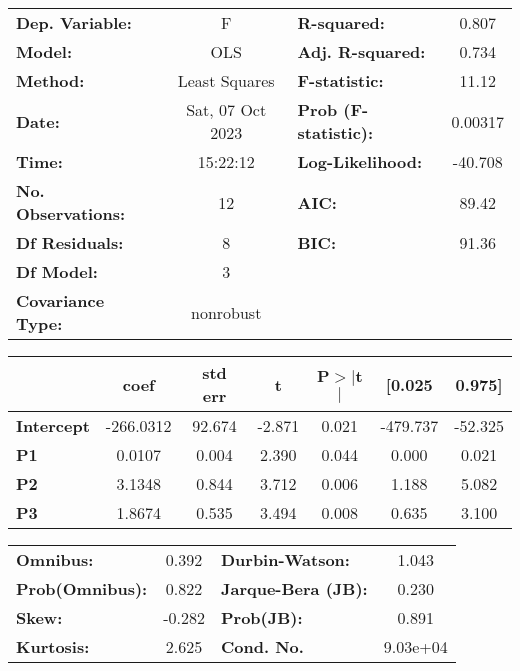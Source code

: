 \documentclass[11pt]{article}
\begin{document}
    \begin{center}
\begin{tabular}{lclc}
\toprule
\textbf{Dep. Variable:}    &        F         & \textbf{  R-squared:         } &     0.807   \\
\textbf{Model:}            &       OLS        & \textbf{  Adj. R-squared:    } &     0.734   \\
\textbf{Method:}           &  Least Squares   & \textbf{  F-statistic:       } &     11.12   \\
\textbf{Date:}             & Sat, 07 Oct 2023 & \textbf{  Prob (F-statistic):} &  0.00317    \\
\textbf{Time:}             &     15:22:12     & \textbf{  Log-Likelihood:    } &   -40.708   \\
\textbf{No. Observations:} &          12      & \textbf{  AIC:               } &     89.42   \\
\textbf{Df Residuals:}     &           8      & \textbf{  BIC:               } &     91.36   \\
\textbf{Df Model:}         &           3      & \textbf{                     } &             \\
\textbf{Covariance Type:}  &    nonrobust     & \textbf{                     } &             \\
\bottomrule
\end{tabular}
\begin{tabular}{lcccccc}
                   & \textbf{coef} & \textbf{std err} & \textbf{t} & \textbf{P$> |$t$|$} & \textbf{[0.025} & \textbf{0.975]}  \\
\midrule
\textbf{Intercept} &    -266.0312  &       92.674     &    -2.871  &         0.021        &     -479.737    &      -52.325     \\
\textbf{P1}        &       0.0107  &        0.004     &     2.390  &         0.044        &        0.000    &        0.021     \\
\textbf{P2}        &       3.1348  &        0.844     &     3.712  &         0.006        &        1.188    &        5.082     \\
\textbf{P3}        &       1.8674  &        0.535     &     3.494  &         0.008        &        0.635    &        3.100     \\
\bottomrule
\end{tabular}
\begin{tabular}{lclc}
\textbf{Omnibus:}       &  0.392 & \textbf{  Durbin-Watson:     } &    1.043  \\
\textbf{Prob(Omnibus):} &  0.822 & \textbf{  Jarque-Bera (JB):  } &    0.230  \\
\textbf{Skew:}          & -0.282 & \textbf{  Prob(JB):          } &    0.891  \\
\textbf{Kurtosis:}      &  2.625 & \textbf{  Cond. No.          } & 9.03e+04  \\
\bottomrule
\end{tabular}
\end{center}
\end{document}
